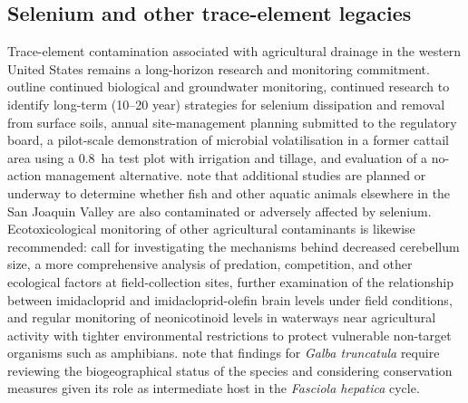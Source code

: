 \subsection{Selenium and other trace-element legacies}
Trace-element contamination associated with agricultural drainage in the western United States remains a long-horizon research and monitoring commitment. \textcite{BENSON1993} outline continued biological and groundwater monitoring, continued research to identify long-term (10--20 year) strategies for selenium dissipation and removal from surface soils, annual site-management planning submitted to the regulatory board, a pilot-scale demonstration of microbial volatilisation in a former cattail area using a 0.8~ha test plot with irrigation and tillage, and evaluation of a no-action management alternative. \textcite{SAIKI1987} note that additional studies are planned or underway to determine whether fish and other aquatic animals elsewhere in the San Joaquin Valley are also contaminated or adversely affected by selenium. Ecotoxicological monitoring of other agricultural contaminants is likewise recommended: \textcite{Campbell2023} call for investigating the mechanisms behind decreased cerebellum size, a more comprehensive analysis of predation, competition, and other ecological factors at field-collection sites, further examination of the relationship between imidacloprid and imidacloprid-olefin brain levels under field conditions, and regular monitoring of neonicotinoid levels in waterways near agricultural activity with tighter environmental restrictions to protect vulnerable non-target organisms such as amphibians. \textcite{Dreyfuss2018} note that findings for \textit{Galba truncatula} require reviewing the biogeographical status of the species and considering conservation measures given its role as intermediate host in the \textit{Fasciola hepatica} cycle.

